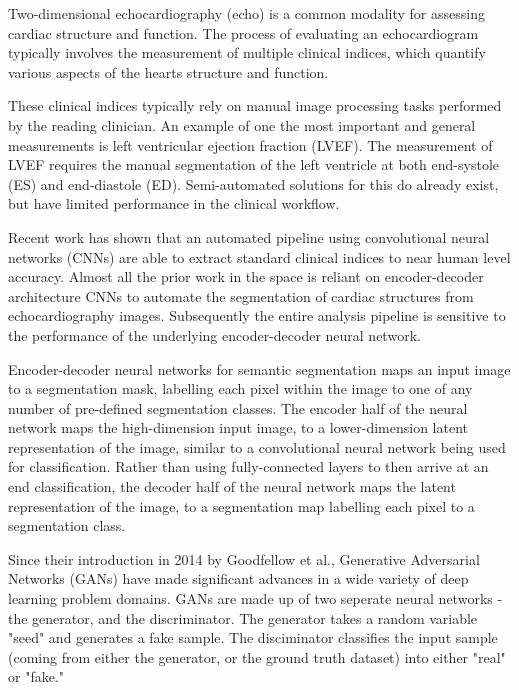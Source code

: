 Two-dimensional echocardiography (echo) is a common modality for assessing cardiac
structure and function. The process of evaluating an echocardiogram typically involves the
measurement of multiple clinical indices, which quantify various aspects of the
hearts structure and function. \newline

These clinical indices typically rely on manual image processing tasks performed 
by the reading clinician. An example of one the most important and general measurements is
left ventricular ejection fraction (LVEF). The measurement of LVEF requires the
manual segmentation of the left ventricle at both end-systole (ES) and
end-diastole (ED). Semi-automated solutions for this do already exist, but have
limited performance in the clinical workflow. \newline

Recent work has shown that an automated pipeline using convolutional neural
networks (CNNs) are able to extract standard clinical indices to near human
level accuracy. Almost all the prior work in the space is reliant on
encoder-decoder architecture CNNs to automate the segmentation of cardiac
structures from echocardiography images. Subsequently the entire analysis
pipeline is sensitive to the performance of the underlying encoder-decoder neural
network. \newline

Encoder-decoder neural networks for semantic segmentation maps an input image to
a segmentation mask, labelling each pixel within the image to one of any number
of pre-defined segmentation classes. The encoder half of the neural network maps
the high-dimension input image, to a lower-dimension latent representation of
the image, similar to a convolutional neural network being used for
classification. Rather than using fully-connected layers to then arrive at an
end classification, the decoder half of the neural network maps the latent
representation of the image, to a segmentation map labelling each pixel to a
segmentation class. \newline

Since their introduction in 2014 by Goodfellow et al., Generative Adversarial
Networks (GANs) have made significant advances in a wide variety of deep learning
problem domains. GANs are made up of two seperate neural networks - the
generator, and the discriminator. The generator takes a random variable "seed"
and generates a fake sample. The disciminator classifies the input sample
(coming from either the generator, or the ground truth dataset) into either
"real" or "fake." \newline

